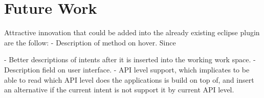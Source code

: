 \section{Future Work}
Attractive innovation that could be added into the already existing eclipse plugin are the follow:
- Description of method on hover.
	Since 

- Better descriptions of intents after it is inserted into the working work space.
- Description field on user interface.
- API level support, which implicates to be able to read which API level does the applications is build on top of, and insert an alternative if the current intent is not support it by current API level.